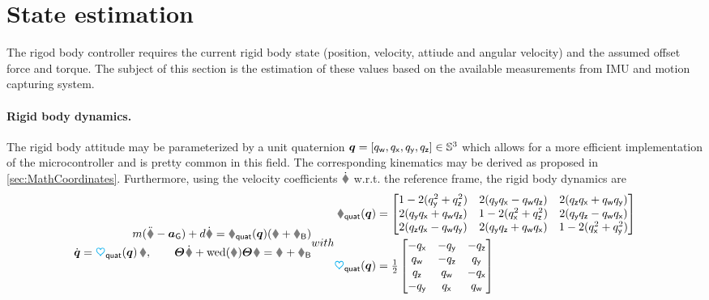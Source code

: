 \section{State estimation}\label{sec:RealizationStateEstimation}
The rigod body controller requires the current rigid body state (position, velocity, attiude and angular velocity) and the assumed offset force and torque.
The subject of this section is the estimation of these values based on the available measurements from IMU and motion capturing system.

\paragraph{Rigid body dynamics.}
The rigid body attitude may be parameterized by a unit quaternion $\boldsymbol{q} = [q_{\mathsf{w}}, q_{\mathsf{x}}, q_{\mathsf{y}}, q_{\mathsf{z}}] \in \mathbb{S}^3$ which allows for a more efficient implementation of the microcontroller and is pretty common in this field.
The corresponding kinematics may be derived as proposed in \autoref{sec:MathCoordinates}.
Furthermore, using the velocity coefficients $\rd$ w.r.t. the reference frame, the rigid body dynamics are
\begin{subequations}\label{eq:RealizationStateDyn}
\begin{align}
 m (\rdd - \gravityAcc) + d \rd = \RotMatQuat(\quat) (\F + \FB)
\\
 \quatd = \kinMatQuat(\quat) \, \w, \qquad
 \bodyMOI{}{} \dot{\w} + \wedOp(\w) \bodyMOI{}{} \w = \bodyTorque{}{} + \tauB
\end{align}
with
\begin{align}
 \RotMatQuat(\quat) &=
 \begin{bmatrix} 
  1 - 2(\quaty^{2} + \quatz^{2}) & 2(\quaty\quatx -\quatw\quatz)  & 2(\quatz\quatx + \quatw\quaty) \\
  2(\quaty\quatx + \quatw\quatz) & 1 - 2(\quatx^{2} + \quatz^{2}) & 2(\quaty\quatz - \quatw\quatx) \\
  2(\quatz\quatx - \quatw\quaty) & 2(\quaty\quatz + \quatw\quatx) & 1 - 2(\quatx^{2} + \quaty^{2})
 \end{bmatrix}
\\
 \kinMatQuat(\quat) &=
 \tfrac{1}{2} \begin{bmatrix}
  -\quatx & -\quaty & -\quatz \\
  \quatw & -\quatz &  \quaty \\
  \quatz &  \quatw & -\quatx \\
  -\quaty &  \quatx &  \quatw
 \end{bmatrix}
\end{align}
\end{subequations}

